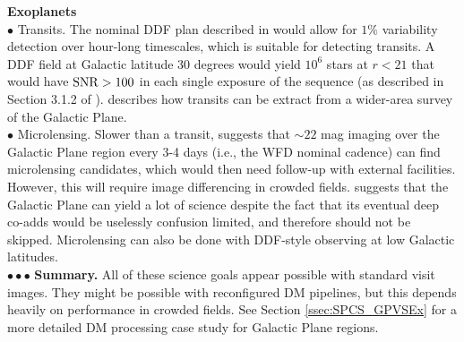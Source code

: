 \documentclass[DM,lsstdraft,toc]{lsstdoc}
\begin{document}
\noindent \textbf{Exoplanets} \\
$\bullet$ Transits. The nominal DDF plan described in \cite{2008arXiv0805.2366I} would allow for $1\%$ variability detection over hour-long timescales, which is suitable for detecting transits. A DDF field at Galactic latitude $30$ degrees would yield $10^6$ stars at $r<21$ that would have ${\rm SNR}>100$ in each single exposure of the sequence (as described in Section 3.1.2 of \cite{2008arXiv0805.2366I}). \cite{2013arXiv1304.3455G} describes how transits can be extract from a wider-area survey of the Galactic Plane.\\
$\bullet$ Microlensing.  Slower than a transit, \cite{2013arXiv1304.3455G} suggests that $\sim22$ mag imaging over the Galactic Plane region every 3-4 days (i.e., the WFD nominal cadence) can find microlensing candidates, which would then need follow-up with external facilities. However, this will require image differencing in crowded fields. \cite{2013arXiv1304.3455G} suggests that the Galactic Plane can yield a lot of science despite the fact that its eventual deep co-adds would be uselessly confusion limited, and therefore should not be skipped. Microlensing can also be done with DDF-style observing at low Galactic latitudes. \\
$\bullet \bullet \bullet$ {\bf Summary.} All of these science goals appear possible with standard visit images. They might be possible with reconfigured DM pipelines, but this depends heavily on performance in crowded fields. See Section \ref{ssec:SPCS_GPVSEx} for a more detailed DM processing case study for Galactic Plane regions.
\end{document}
